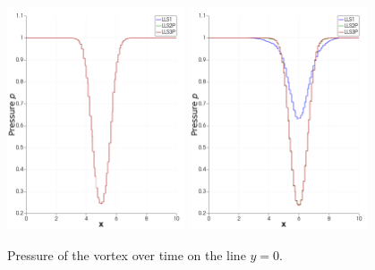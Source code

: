 \begin{figure}[p]
\centering
{} {
	\includegraphics[width=0.47\textwidth]{vortexhor1.png}
} \hfill
{} {
	\includegraphics[width=0.47\textwidth]{vortexhor2.png}
}
\caption{Pressure of the vortex over time on the line $y = 0$.}
\label{fig:comparison2-vortex}
\end{figure}

